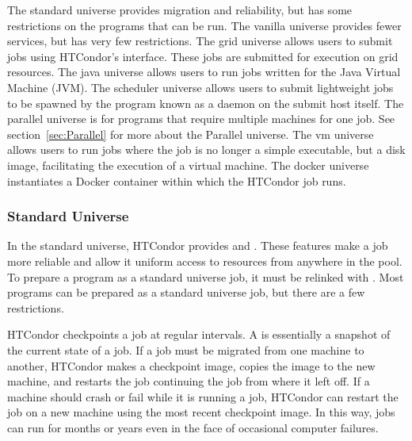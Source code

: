 The standard universe provides migration and reliability, but has some
restrictions on the programs that can be run. 
The vanilla universe provides fewer services, but has very few
restrictions.
The grid universe allows users to submit 
jobs using HTCondor's interface.
These jobs are submitted for execution on grid resources.
The java universe allows users to run jobs written for the
Java Virtual Machine (JVM).
The scheduler universe allows users to submit lightweight jobs
to be spawned by the program known as a daemon on the submit host itself.
The parallel universe is for programs that require multiple machines
for one job.
See section~\ref{sec:Parallel} for more about the Parallel universe.
The vm universe allows users to run jobs where the job is
no longer a simple executable, but a disk image, facilitating
the execution of a virtual machine.
The docker universe instantiates a Docker container within which
the HTCondor job runs.

\subsubsection{\label{sec:standard-universe}Standard Universe}

In the standard universe, HTCondor provides  and
.  These features make a job more reliable
and allow it uniform access to resources from anywhere in the pool.
To prepare a program as a standard universe job, it must be relinked
with .  Most programs can be prepared as a standard
universe job, but there are a few restrictions.

HTCondor checkpoints a job at regular intervals.
A  is essentially a snapshot of the current
state of a job. 
If a job must be migrated from one machine to another,
HTCondor makes a checkpoint image, copies the image to the new machine,
and restarts the job continuing the job from where it left off.
If a machine should
crash or fail while it is running a job, HTCondor can restart the job on
a new machine using the most recent checkpoint image.
In this way, jobs
can run for months or years even in the face of occasional computer failures.

